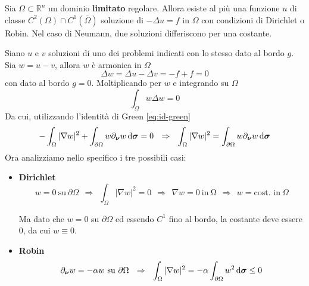 \begin{theorem}[Unicità]
    Sia $\Omega \subset \mathbb{R}^{n}$ un dominio \textbf{limitato} regolare. Allora esiste al più una funzione $u$ di classe $C^{2}(\Omega) \cap C^{1}(\overline{\Omega })$ soluzione di $-\Delta u=f$ in $\Omega $ con condizioni di Dirichlet o Robin. Nel caso di Neumann, due soluzioni differiscono per una costante.
\end{theorem}
\begin{dimostrazione}
    Siano $u$ e $v$ soluzioni di uno dei problemi indicati con lo stesso dato al bordo $g$. Sia $w=u-v$, allora $w$ è armonica in $\Omega $
    \begin{equation*}
        \Delta w=\Delta u-\Delta v=-f+f=0
    \end{equation*}
    con dato al bordo $g=0$. Moltiplicando per $w$ e integrando su $\Omega $
    \begin{equation*}
        \int _{\Omega } w\Delta w=0
    \end{equation*}
    Da cui, utilizzando l'identità di Green \eqref{eq:id-green}
    \begin{equation*}
        -\int _{\Omega }| \nabla w| ^{2} +\int _{\partial \Omega } w\partial _{\bm{\nu}} w\,\mathrm d \bm{\sigma} =0\ \ \Rightarrow \ \ \int _{\Omega }| \nabla w| ^{2} =\int _{\partial \Omega } w\partial _{\bm{\nu}} w\,\mathrm d \bm{\sigma}
    \end{equation*}
    Ora analizziamo nello specifico i tre possibili casi:
    \begin{itemize}
        \item \textbf{Dirichlet}
              \begin{equation*}
                  w=0\ \text{su} \ \partial \Omega \ \ \Rightarrow \ \ \int _{\Omega }| \nabla w| ^{2} =0\ \ \Rightarrow \ \ \nabla w=0\ \text{in} \ \mathrm{\Omega } \ \ \Rightarrow \ \ w=\text{cost. in} \ \Omega
              \end{equation*}

              Ma dato che $w=0$ su $\displaystyle \partial \Omega $ ed essendo $\displaystyle C^{1}$ fino al bordo, la costante deve essere $0$, da cui $\displaystyle w\equiv 0$.
        \item \textbf{Robin}
              \begin{equation*}
                  \partial_{\bm{\nu}} w=-\alpha w\ \text{su} \ \partial \Omega \ \ \Rightarrow \ \ \int _{\Omega }| \nabla w| ^{2} =-\alpha \int _{\partial \Omega } w^{2} \,\mathrm d \bm{\sigma} \leq 0
              \end{equation*}


\end{itemize}
\end{dimostrazione}
